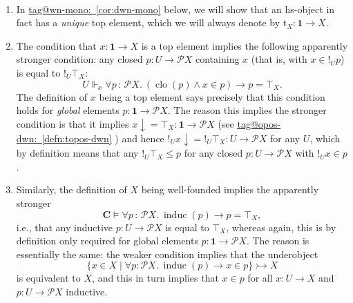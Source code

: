 \documentclass{amsart}
\makeatletter
\newcommand\bC{\mathbf{C}}
\newcommand\clo{\operatorname{clo}}
\newcommand\dwn{\mathpunct{\downarrow}}
\newcommand\enumbelow{\ }
\newcommand\induc{\operatorname{induc}}
\newcommand\pow{\mathcal{P}}
\newcommand\rt{\mathrm{t}}
\newcommand\set[2][]{#1\{ #2 #1\}}
\newcommand\tm{\mathbf{1}}
\newcommand\tolon{{\,:\,}}
\newcommand\tto{\rightarrowtail}
\newcommand\unex{{!}}
\newcommand\tagword[1]{\csname tag@#1\endcsname}
\def\label@tag#1:#2\@nil{#1}
\newcommand\labeltag[1]{\label@tag#1:\@nil}
\newcommand\jref[1]{%
  \texorpdfstring%
    {\hyperref[#1]{\tagword{\labeltag{#1}}~\ref*{#1}}}%
    {\tagword{\labeltag{#1}}~\ref*{#1}}%
}
\theoremstyle{definition}
\theoremstyle{remark}
\theoremstyle{plainwithref}
\makeatother
\begin{document}
\begin{rmk} \label{rmk:on-topos-hs} \enumbelow
  \begin{enumerate}[1.]
  \item In \jref{cor:dwn-mono} below, we will show that an hs-object in fact has a \emph{unique} top element, which we will always denote by \( \rt_X \colon \tm \to X \).
  \item The condition that \( x \colon \tm \to X \) is a top element implies the following apparently stronger condition: any closed \( p \colon U \to \pow X \) containing \( x \) (that is, with \( x \in \unex_U p \)) is equal to \( \unex_U \top_X \):
    \[
      U \Vdash_x \forall p \tolon \pow X.\ (\clo(p) \wedge x \in p) \to p = \top_X.
    \]
    The definition of \( x \) being a top element says precisely that this condition holds for \emph{global} elements \( p \colon \tm \to \pow X \).
    The reason this implies the stronger condition is that it implies \( x \dwn = \top_X \colon \tm \to \pow X \) (see \jref{defn:topos-dwn}) and hence \( \unex_U x \dwn = \unex_U \top_X \colon U \to \pow X \) for any \( U \), which by definition means that any \( \unex_U \top_X \le p \) for any closed \( p \colon U \to \pow X \) with \( \unex_U x \in p \).
  \item Similarly, the definition of \( X \) being well-founded implies the apparently stronger
    \[
      \bC \vDash \forall p \tolon \pow X.\ \induc(p) \to p = \top_X,
    \]
    i.e., that any inductive \( p \colon U \to \pow X \) is equal to \( \top_X \), whereas again, this is by definition only required for global elements \( p \colon \tm \to \pow X \).
    The reason is essentially the same: the weaker condition implies that the underobject
    \[
      \set{ x \in X \mid \forall p \colon \pow X.\ \induc(p) \to x \in p } \tto X
    \]
    is equivalent to \( X \), and this in turn implies that \( x \in p \) for all \( x \colon U \to X \) and \( p \colon U \to \pow X \) inductive.
  \end{enumerate}
\end{rmk}
\end{document}
